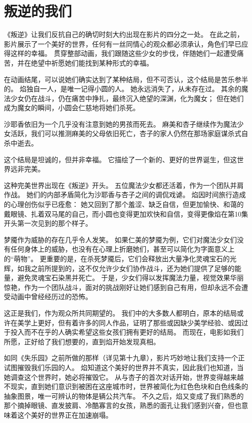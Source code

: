 \chapter{叛逆的我们}
《叛逆》让我们反抗自己的确切时刻大约出现在影片的四分之一处。
在此之前，影片展示了一个美好的世界，任何有一丝同情心的观众都必须承认，角色们早已应得这样的幸福。
贯穿整部动画，我们跟随这些少女的步伐，伴随她们一起遭受痛苦，并在绝望中祈愿她们能找到某种形式的幸福。

在动画结尾，可以说她们确实达到了某种结局，但不可否认，这个结局是苦乐参半的。
焰独自一人，是唯一记得小圆的人。
她永远消失了，从未存在过。
其余的魔法少女仍在战斗，仍在痛苦中挣扎，最终沉入绝望的深渊，化为魔女；
但在她们成为魔女的瞬间，小圆会仁慈地将她们杀死。

沙耶香依旧为一个几乎没有注意到她的男孩而死去。
麻美和杏子继续作为魔法少女活跃，我们可以推测麻美的父母依旧死亡，杏子的家人仍然在那场家庭谋杀式自杀中逝去。

这个结局是坦诚的，但并非幸福。
它描绘了一个新的、更好的世界诞生，但这世界远非完美。

这种完美世界出现在《叛逆》开头。
五位魔法少女都还活着，作为一个团队并肩作战。
她们的内部矛盾简化为沙耶香与杏子之间的调侃戏谑。
焰因时间旅行造成的心理创伤似乎已痊愈：
她又回到了那个羞涩、缺乏自信，但更加愉快、和蔼的戴眼镜、扎着双马尾的自己，而小圆也变得更加欢快和自信，变得更像焰在第10集开头第一次见到的那个样子。

梦魇作为威胁的存在几乎令人发笑。
如果仁美的梦魇为例，它们对魔法少女们没有任何身体上的威胁，也没有在心理上折磨她们，甚至可以简化为字面意义上的“萌物”。
更重要的是，在杀死梦魇后，它们会释放出大量净化灵魂宝石的光辉，如我之前所提到的，这不仅允许少女们协作战斗，还为她们提供了足够的能量，避免灵魂宝石染黑并死亡。
于是，少女们得以发挥魔法力量，视觉效果华丽惊艳，作为一个团队战斗，面对的挑战刚好让她们感到自己有用，但却永远不会遭受动画中曾经经历过的恐怖。

这正是我们，作为观众所共同期望的。
我们中的大多数人都明白，原本的结局或许在美学上更好，但有着许多的同人作品，证明了那些或因缺少美学经验、或因过于投入而不在乎的人确实希望这些女孩们拥有更好的结局。
而现在，电影如我们所愿，正好给了我们想要的，直到焰开始发现真相。

如同《失乐园》之前所做的那样（详见第十九章），影片巧妙地让我们支持一个正试图摧毁我们乐园的人。
焰知道这个美好的世界并不真实，因此我们也知道，当她调查这个世界时，她必将摧毁它。
从与杏子的首次对话开始，世界变得越来越不现实，直到她们意识到被困在这座城市时，世界被简化为红色色块和白色线条的抽象图景，唯一可辨认的物体是辆公共汽车。
不久之后，焰又变成了我们熟悉的那个摘掉眼镜、直发披肩、冷酷寡言的女孩，熟悉的面孔让我们感到兴奋，但也意味着这个美好的世界正在加速崩塌。

